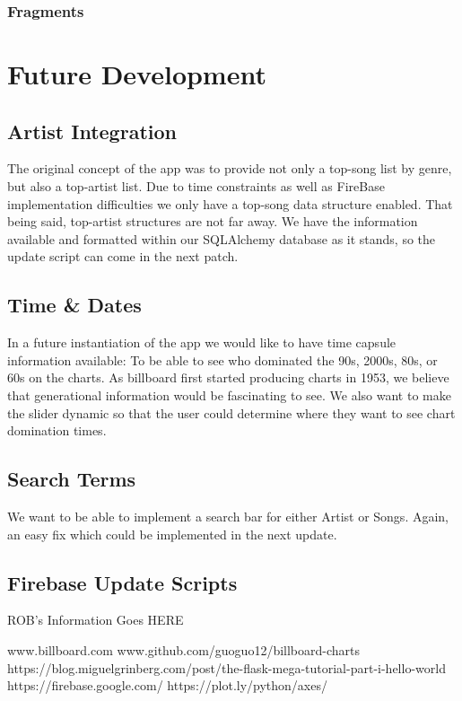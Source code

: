 \documentclass{article}
\begin{document}
\subsubsection*{Fragments}

\section*{Future Development}
\subsection*{Artist Integration}
The original concept of the app was to provide not only a top-song list by genre, but also a top-artist list. Due to time constraints as well as FireBase implementation difficulties we only have a top-song data structure enabled. That being said, top-artist structures are not far away. We have the information available and formatted within our SQLAlchemy database as it stands, so the update script can come in the next patch.
\subsection*{Time \& Dates}
In a future instantiation of the app we would like to have time capsule information available: To be able to see who dominated the 90s, 2000s, 80s, or 60s on the charts. As billboard first started producing charts in 1953, we believe that generational information would be fascinating to see. We also want to make the slider dynamic so that the user could determine where they want to see chart domination times. 
\subsection*{Search Terms}
We want to be able to implement a search bar for either Artist or Songs. Again, an easy fix which could be implemented in the next update.  
\subsection*{Firebase Update Scripts}






ROB's Information Goes HERE







\begin{thebibliography}{00}
www.billboard.com
www.github.com/guoguo12/billboard-charts
https://blog.miguelgrinberg.com/post/the-flask-mega-tutorial-part-i-hello-world
https://firebase.google.com/
https://plot.ly/python/axes/
\end{thebibliography}
\end{document}
